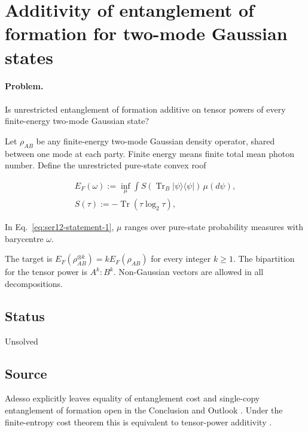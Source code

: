\section{Additivity of entanglement of formation for two-mode Gaussian states}
\label{sec:op_c1499a0073ee800c}

\paragraph{Problem.}
Is unrestricted entanglement of formation additive on tensor powers of every finite-energy two-mode Gaussian state?

Let $\rho_{AB}$ be any finite-energy two-mode Gaussian density operator, shared between one mode at each party. Finite energy means finite total mean photon number. Define the unrestricted pure-state convex roof

\begin{equation}
\begin{gathered}
E_F(\omega):=\inf_\mu\int S(\operatorname{Tr}_B|\psi\rangle\langle\psi|)\,\mu(d\psi),
\\
S(\tau):=-\operatorname{Tr}(\tau\log_2\tau),
\end{gathered}
\label{eq:ser12-statement-1}
\end{equation}

In Eq.~\eqref{eq:ser12-statement-1}, $\mu$ ranges over pure-state probability measures with barycentre $\omega$.

The target is $E_F(\rho_{AB}^{\otimes k})=kE_F(\rho_{AB})$ for every integer $k\geq1$. The bipartition for the tensor power is $A^k:B^k$. Non-Gaussian vectors are allowed in all decompositions.

\subsection*{Status}

Unsolved

\subsection*{Source}

Adesso explicitly leaves equality of entanglement cost and single-copy entanglement of formation open in the Conclusion and Outlook . Under the finite-entropy cost theorem this is equivalent to tensor-power additivity .

